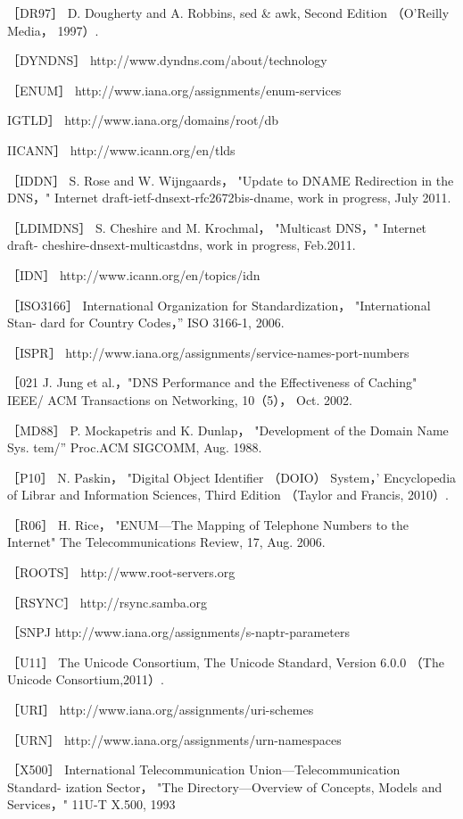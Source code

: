 ［DR97］ D. Dougherty and A. Robbins, sed \& awk, Second Edition （O'Reilly Media，
1997）.

［DYNDNS］ http://www.dyndns.com/about/technology

［ENUM］ http://www.iana.org/assignments/enum-services

IGTLD］ http://www.iana.org/domains/root/db

IICANN］ http://www.icann.org/en/tlds

［IDDN］ S. Rose and W. Wijngaards， "Update to DNAME Redirection in the
DNS，" Internet draft-ietf-dnsext-rfc2672bis-dname, work in progress, July 2011.

［LDIMDNS］ S. Cheshire and M. Krochmal， "Multicast DNS，" Internet draft-
cheshire-dnsext-multicastdns, work in progress, Feb.2011.

［IDN］ http://www.icann.org/en/topics/idn

［ISO3166］ International Organization for Standardization， "International Stan-
dard for Country Codes，” ISO 3166-1, 2006.

［ISPR］ http://www.iana.org/assignments/service-names-port-numbers

［021 J. Jung et al.，"DNS Performance and the Effectiveness of Caching" IEEE/
ACM Transactions on Networking, 10（5）， Oct. 2002.

［MD88］ P. Mockapetris and K. Dunlap， "Development of the Domain Name Sys.
tem/” Proc.ACM SIGCOMM, Aug. 1988.

［P10］ N. Paskin， "Digital Object Identifier （DOIO） System，' Encyclopedia of Librar
and Information Sciences, Third Edition （Taylor and Francis, 2010）.

［R06］ H. Rice， "ENUM—The Mapping of Telephone Numbers to the Internet"
The Telecommunications Review, 17, Aug. 2006.

［ROOTS］ http://www.root-servers.org

［RSYNC］ http://rsync.samba.org

［SNPJ http://www.iana.org/assignments/s-naptr-parameters

［U11］ The Unicode Consortium, The Unicode Standard, Version 6.0.0 （The Unicode
Consortium,2011）.

［URI］ http://www.iana.org/assignments/uri-schemes

［URN］ http://www.iana.org/assignments/urn-namespaces

［X500］ International Telecommunication Union—Telecommunication Standard-
ization Sector， "The Directory—Overview of Concepts, Models and Services，"
11U-T X.500, 1993